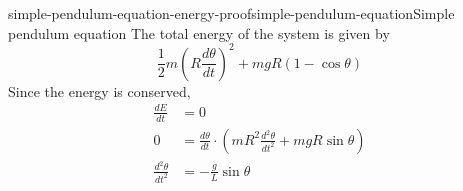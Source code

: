 \documentclass[preview]{standalone}
\begin{document}

\begin{snippetproof}{simple-pendulum-equation-energy-proof}{simple-pendulum-equation}{Simple pendulum equation}
    The total energy of the system is given by
    \[
        \frac{1}{2}m {\left(R\frac{d\theta}{dt}\right)}^2
        + mgR(1-\cos\theta)
    \]
    Since the energy is conserved,
    \begin{align*}
        \frac{dE}{dt} &= 0 \\
        0 &= \frac{d\theta}{dt} \cdot \left(mR^2 \frac{d^2\theta}{dt^2} + mgR\sin\theta\right) \\
        \frac{d^2\theta}{dt^2} &= -\frac{g}{L}\sin\theta
    \end{align*}
\end{snippetproof}
\end{document}
